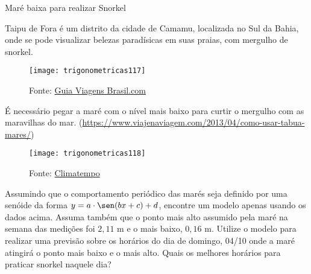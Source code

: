 \begin{task}{Maré baixa para realizar Snorkel}

Taipu de Fora é um distrito da cidade de Camamu, localizada no Sul da Bahia, onde se pode visualizar belezas paradísicas em suas praias, com mergulho de snorkel.

\begin{figure}[H]
\centering

\texttt{[image: trigonometricas117]}
\caption{Fonte: \href{guiaviagensbrasil.com}{Guia Viagens Brasil.com}}

\end{figure}

É necessário pegar a maré com o nível mais baixo para curtir o mergulho com as maravilhas do mar. (\url{https://www.viajenaviagem.com/2013/04/como-usar-tabua-mares/})

\begin{figure}[H]
\centering

\texttt{[image: trigonometricas118]}
\caption{Fonte: \href{https://www.climatempo.com.br/tabua-de-mares}{Climatempo}}

\end{figure}

Assumindo que o comportamento periódico das marés seja definido por uma senóide da forma $y = a\cdot\sen(bx+c) + d$, encontre um modelo apenas usando os dados acima. Assuma também que o ponto mais alto assumido pela maré na semana das medições foi $2{,}11$ m e o mais baixo, $0{,}16$ m. Utilize o modelo para realizar uma previsão sobre os horários do dia de domingo, 04/10 onde a maré atingirá o ponto mais baixo e o mais alto. Quais os melhores horários para praticar snorkel naquele dia?
\end{task}

\clearpage

\exercise

